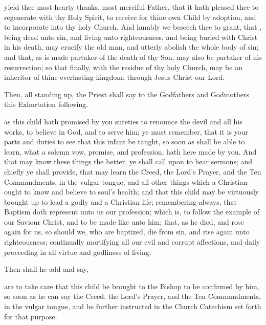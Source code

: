  yield thee most hearty thanks, most merciful Father, that it hath pleased thee to regenerate  with thy Holy Spirit, to receive  for thine own Child by adoption, and to incorporate  into thy holy Church.
And humbly we beseech thee to grant, that , being dead unto sin, and living unto righteousness, and being buried with Christ in his death, may crucify the old man, and utterly abolish the whole body of sin; and that, as  is made partaker of the death of thy Son,  may also be partaker of his resurrection; so that finally, with the residue of thy holy Church,  may be an inheritor of thine everlasting kingdom; through Jesus Christ our Lord.

\newpage

\begin{rubric}
Then, all standing up, the Priest shall say to the Godfathers and Godmothers this Exhortation following.
\end{rubric}

 as this child hath promised by you  sureties to renounce the devil and all his works, to believe in God, and to serve him; ye must remember, that it is your parts and duties to see that this infant be taught, so soon as  shall be able to learn, what a solemn vow, promise, and profession,  hath here made by you.
And that  may know these things the better, ye shall call upon  to hear sermons; and chiefly ye shall provide, that  may learn the Creed, the Lord's Prayer, and the Ten Commandments, in the vulgar tongue, and all other things which a Christian ought to know and believe to  soul's health; and that this child may be virtuously brought up to lead a godly and a Christian life; remembering always, that Baptism doth represent unto us our profession; which is, to follow the example of our Saviour Christ, and to be made like unto him; that, as he died, and rose again for us, so should we, who are baptized, die from sin, and rise again unto righteousness; continually mortifying all our evil and corrupt affections, and daily proceeding in all virtue and godliness of living.

\begin{rubric}
Then shall he add and say,
\end{rubric}

 are to take care that this child be brought to the Bishop to be confirmed by him, so soon as he can say the Creed, the Lord's Prayer, and the Ten Commandments, in the vulgar tongue, and be further instructed in the Church Catechism set forth for that purpose.
